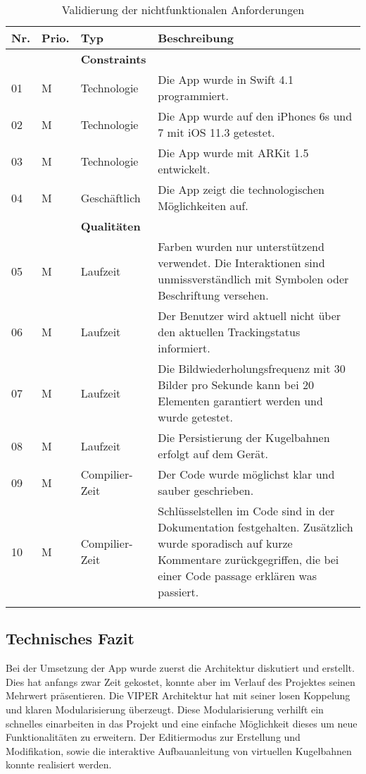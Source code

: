 \begin{longtable}{l l l p{10cm}}
	\hline
	\textbf{Nr.} & \textbf{Prio.} & \textbf{Typ} & \textbf{Beschreibung} \\
	\hline
	 & & \textbf{Constraints} & \\
	\hline
	01 & M & Technologie & Die App wurde in Swift 4.1 programmiert. \\
	\hline
	02 & M & Technologie & Die App wurde auf den iPhones 6s und 7 mit iOS 11.3 getestet. \\
	\hline
	03 & M & Technologie & Die App wurde mit ARKit 1.5 entwickelt. \\
	\hline
	04 & M & Geschäftlich & Die App zeigt die technologischen Möglichkeiten auf. \\
	\hline
	 & & \textbf{Qualitäten}& \\
	\hline
	05 & M & Laufzeit & Farben wurden nur unterstützend verwendet. Die Interaktionen sind unmissverständlich mit Symbolen oder Beschriftung versehen. \\ 
	\hline
	06 & M & Laufzeit & Der Benutzer wird aktuell nicht über den aktuellen Trackingstatus informiert. \\
	\hline
	07 & M & Laufzeit & Die Bildwiederholungsfrequenz mit 30 Bilder pro Sekunde kann bei 20 Elementen garantiert werden und wurde getestet. \\
	\hline
	08 & M & Laufzeit & Die Persistierung der Kugelbahnen erfolgt auf dem Gerät. \\
	\hline
	09 & M & Compilier-Zeit & Der Code wurde möglichst klar und sauber geschrieben. \\
	\hline
	10 & M & Compilier-Zeit & Schlüsselstellen im Code sind in der Dokumentation festgehalten. Zusätzlich wurde sporadisch auf kurze Kommentare zurückgegriffen, die bei einer Code passage erklären was passiert. \\
	\hline
	\caption{Validierung der nichtfunktionalen Anforderungen}
\end{longtable}


\subsection{Technisches Fazit}
Bei der Umsetzung der App wurde zuerst die Architektur diskutiert und erstellt. Dies hat anfangs zwar Zeit gekostet, konnte aber im Verlauf des Projektes seinen Mehrwert präsentieren. Die VIPER Architektur hat mit seiner losen Koppelung und klaren Modularisierung überzeugt. Diese Modularisierung verhilft ein schnelles einarbeiten in das Projekt und eine einfache Möglichkeit dieses um neue Funktionalitäten zu erweitern. Der Editiermodus zur Erstellung und Modifikation, sowie die interaktive Aufbauanleitung von virtuellen Kugelbahnen konnte realisiert werden.

